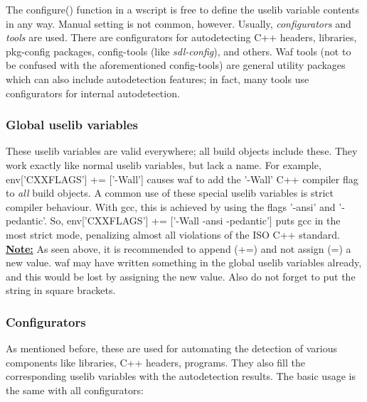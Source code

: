 \documentclass[a4paper,10pt]{article}
\begin{document}
The configure() function in a wscript is free to define the uselib variable contents in any way. Manual setting is not common, however. Usually, \emph{configurators} and \emph{tools} are used. There are configurators for autodetecting C++ headers, libraries, pkg-config packages, config-tools (like \emph{sdl-config}), and others. Waf tools (not to be confused with the aforementioned config-tools) are general utility packages which can also include autodetection features; in fact, many tools use configurators for internal autodetection.

\subsubsection{Global uselib variables}
These uselib variables are valid everywhere; all build objects include these. They work exactly like normal uselib variables, but lack a name. For example, env['CXXFLAGS'] += ['-Wall'] causes waf to add the '-Wall' C++ compiler flag to \emph{all} build objects. A common use of these special uselib variables is strict compiler behaviour. With gcc, this is achieved by using the flags '-ansi' and '-pedantic'. So, env['CXXFLAGS'] += ['-Wall -ansi -pedantic'] puts gcc in the most strict mode, penalizing almost all violations of the ISO C++ standard.\\

\textbf{\underline{Note:}} As seen above, it is recommended to append (+=) and not assign (=) a new value. waf may have written something in the global uselib variables already, and this would be lost by assigning the new value. Also do not forget to put the string in square brackets.

\subsubsection{Configurators}
As mentioned before, these are used for automating the detection of various components like libraries, C++ headers, programs. They also fill the corresponding uselib variables with the autodetection results. The basic usage is the same with all configurators:
\end{document}
